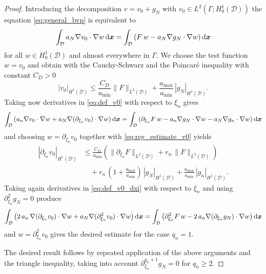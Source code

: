 \documentclass[a4paper,10pt]{article}
\newcommand{\bx}{{\boldsymbol{x}}}
\newcommand{\cD}{{\mathcal{D}}}
\renewcommand{\d}{\textup{d}}
\numberwithin{theorem}{section}
\begin{document}
\begin{proof}
  Introducing the decomposition $v = v_0 + g_N$ with $v_0\in L^2(\Gamma; H^1_0(\cD))$ the equation \eqref{eq:general_bvp} is equivalent to
  \begin{equation}\label{eq:def_v0}
    \int_\cD a_N\nabla v_0 \cdot \nabla w\,\d\bx = \int_\cD \left(F\,w - a_N\nabla g_N\cdot \nabla w\right)\d \bx
  \end{equation}
  for all $w\in H_0^1(\cD)$ and almost everywhere in $\Gamma$.  
  We choose the test function $w = v_0$ and obtain with the Cauchy-Schwarz and the Poincar\'e inequality with constant $C_D>0$
  \begin{equation}\label{eq:reg_estimate_v0}
    |v_0|_{H^1(\cD)}
    \le \frac{C_D}{a_{\min}} \|F\|_{L^2(\cD)} + \frac{a_{\max}}{a_{\min}} \,|g_N|_{H^1(\cD)}.
  \end{equation}
  Taking now derivatives in \eqref{eq:def_v0} with respect to $\xi_n$ gives
  \begin{equation}\label{eq:def_v0_dxi}
    \int_{\cD} \left( a_n\nabla v_0\cdot \nabla w + a_N\nabla (\partial_{\xi_n} v_0)\cdot\nabla w\right) \d \bx
    =
    \int_{\cD}\left(\partial_{\xi_n} F\,w - a_n\nabla g_N\cdot\nabla w - a_N\nabla g_n\cdot\nabla w\right)\d \bx
  \end{equation}
  and choosing $w=\partial_{\xi_n} v_0$ together with \eqref{eq:reg_estimate_v0} yields
  \begin{align*}
    |\partial_{\xi_n} v_0|_{H^1(\cD)}
    &\le
      \frac{C_D}{a_{\min}} \left(\|\partial_{\xi_n} F\|_{L^2(\cD)} + r_n\,\|F\|_{L^2(\cD)}\right) \\
    & \quad + r_n\,(1+\frac{a_{\max}}{a_{\min}})\, |g_N|_{H^1(\cD)}
      + \frac{a_{\max}}{a_{\min}}\,|g_n|_{H^1(\cD)}.
  \end{align*}
  Taking again derivatives in \eqref{eq:def_v0_dxi} with respect to $\xi_n$ and using $\partial_{\xi_n}^2 g_N=0$ produce
  \begin{equation*}
     \int_{\cD} \left(2\,a_n\,\nabla(\partial_{\xi_n}v_0)\cdot \nabla w + a_N\nabla(\partial_{\xi_n}^2 v_0)\cdot \nabla w\right)\d\bx 
    = \int_{\cD} \left(\partial_{\xi_n}^2 F\,w - 2\,a_n\nabla(\partial_{\xi_n} g_N)\cdot\nabla w\right)\d \bx
  \end{equation*}
 and $w=\partial_{\xi_n}^2 v_0$ gives the desired estimate for the case $q_n=1$.
    
  The desired result follows by repeated application of the above arguments and the triangle inequality, taking into account $\partial_{\xi_n}^{q_n+1} g_N = 0$ for $q_n\ge 2$.
\end{proof}
\end{document}
